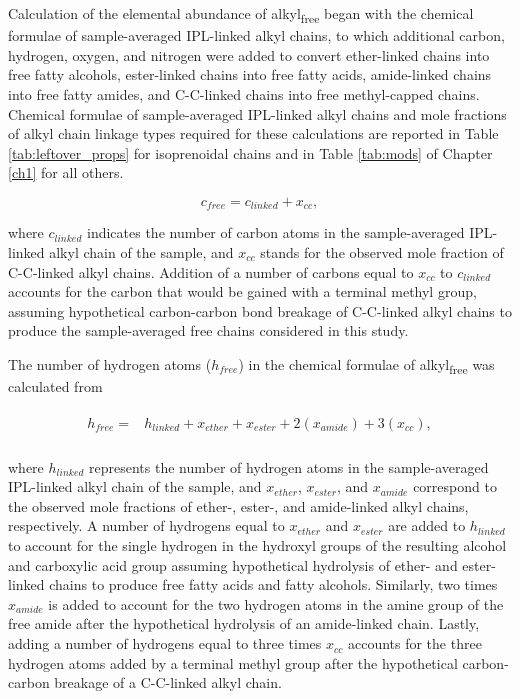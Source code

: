 Calculation of the elemental abundance of alkyl\textsubscript{free} began with the chemical formulae of sample-averaged IPL-linked alkyl chains, to which additional carbon, hydrogen, oxygen, and nitrogen were added to convert ether-linked chains into free fatty alcohols, ester-linked chains into free fatty acids, amide-linked chains into free fatty amides, and C-C-linked chains into free methyl-capped chains. Chemical formulae of sample-averaged IPL-linked alkyl chains and mole fractions of alkyl chain linkage types required for these calculations are reported in Table \ref{tab:leftover_props} for isoprenoidal chains and in Table \ref{tab:mods} of Chapter \ref{ch1} for all others.


\begin{equation}
    c_{free} = c_{linked} + x_{cc},
\end{equation}

\noindent where $c_{linked}$ indicates the number of carbon atoms in the sample-averaged IPL-linked alkyl chain of the sample, and $x_{cc}$ stands for the observed mole fraction of C-C-linked alkyl chains. Addition of a number of carbons equal to $x_{cc}$ to $c_{linked}$ accounts for the carbon that would be gained with a terminal methyl group, assuming hypothetical carbon-carbon bond breakage of C-C-linked alkyl chains to produce the sample-averaged free chains considered in this study.

The number of hydrogen atoms ($h_{free}$) in the chemical formulae of alkyl\textsubscript{free} was calculated from

\begin{align}
\begin{split}
    h_{free} = &h_{linked} + x_{ether} + x_{ester} + 2(x_{amide}) + 3(x_{cc}), \\
\end{split}
\end{align}

\noindent where $h_{linked}$ represents the number of hydrogen atoms in the sample-averaged IPL-linked alkyl chain of the sample, and $x_{ether}$, $x_{ester}$, and $x_{amide}$ correspond to the observed mole fractions of ether-, ester-, and amide-linked alkyl chains, respectively. A number of hydrogens equal to $x_{ether}$ and $x_{ester}$ are added to $h_{linked}$ to account for the single hydrogen in the hydroxyl groups of the resulting alcohol and carboxylic acid group assuming hypothetical hydrolysis of ether- and ester-linked chains to produce free fatty acids and fatty alcohols. Similarly, two times $x_{amide}$ is added to account for the two hydrogen atoms in the amine group of the free amide after the hypothetical hydrolysis of an amide-linked chain. Lastly, adding a number of hydrogens equal to three times $x_{cc}$ accounts for the three hydrogen atoms added by a terminal methyl group after the hypothetical carbon-carbon breakage of a C-C-linked alkyl chain.

